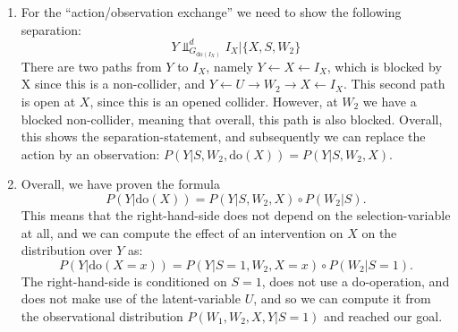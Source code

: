 \begin{gradedsolution}
\begin{enumerate}
	  For step 3, one can directly apply Remark 5.2.7 from the lecture notes on the connection between product Markov kernels and compositions of Markov kernels.
	\item For the ``action/observation exchange'' we need to show the following separation:
	  \begin{equation*}
	    Y \Perp_{G_{\text{do}(I_X)}}^d I_X | \{X, S, W_2\}
	  \end{equation*}
	  There are two paths from $Y$ to $I_X$, namely $Y \leftarrow X \leftarrow I_X$, which is blocked by X since this is a non-collider, and $Y \leftarrow U \rightarrow W_2 \rightarrow X \leftarrow I_X$.
	  This second path is open at $X$, since this is an opened collider. However, at $W_2$ we have a blocked non-collider, meaning that overall, this path is also blocked.
	  Overall, this shows the separation-statement, and subsequently we can replace the action by an observation: $P(Y | S, W_2, \text{do}(X)) = P(Y | S, W_2, X) $.
	\item Overall, we have proven the formula 
	  \begin{equation*}
	    P(Y | \text{do}(X)) = P(Y | S, W_2, X) \circ P(W_2 | S).
	  \end{equation*}
	  This means that the right-hand-side does not depend on the selection-variable at all, and we can compute the effect of an intervention on $X$ on the distribution over $Y$ as:
	  \begin{equation*}
	    P(Y | \text{do}(X = x)) = P(Y | S = 1, W_2, X = x) \circ P(W_2 | S = 1).
	  \end{equation*}
	  The right-hand-side is conditioned on $S=1$, does not use a do-operation, and does not make use of the latent-variable $U$, and so we can compute it from the observational distribution $P(W_1, W_2, X, Y | S=1)$ and reached our goal.
	\end{enumerate}
    \end{gradedsolution}



